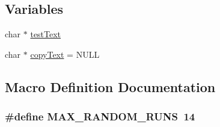 \subsection*{Variables}
\begin{DoxyCompactItemize}
\item 
char $\ast$ \hyperlink{test-streams_8c_afa39263caa6940c140e0c51d80cb7a94}{test\+Text}
\item 
char $\ast$ \hyperlink{test-streams_8c_aa84296588da5228afda58b406eb63d3c}{copy\+Text} = N\+U\+L\+L
\end{DoxyCompactItemize}


\subsection{Macro Definition Documentation}
\hypertarget{test-streams_8c_a1b9ccf4fcafb1e54dcb6d3132ef07e08}{
\subsubsection[{M\+A\+X\+\_\+\+R\+A\+N\+D\+O\+M\+\_\+\+R\+U\+N\+S}]{\setlength{\rightskip}{0pt plus 5cm}\#{\bf define} M\+A\+X\+\_\+\+R\+A\+N\+D\+O\+M\+\_\+\+R\+U\+N\+S~14}}\label{test-streams_8c_a1b9ccf4fcafb1e54dcb6d3132ef07e08}


